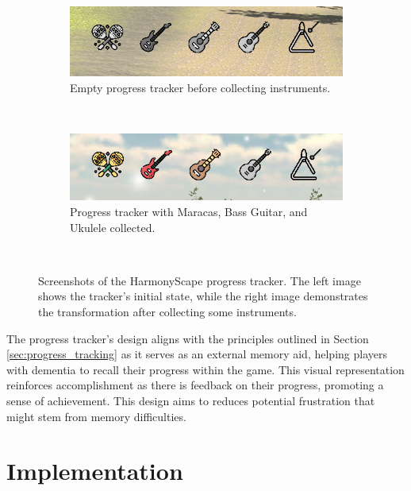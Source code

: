 \documentclass{l4proj}
\begin{document}
\begin{figure}[h]
  \centering
  \begin{subfigure}[b]{0.45\textwidth}
    \includegraphics[width=\textwidth]{dissertation/images/progress_tracker_empty.png}
    \caption{Empty progress tracker before collecting instruments.}
    \label{fig:progress_empty}
  \end{subfigure}
  ~ 
  \begin{subfigure}[b]{0.45\textwidth}
    \includegraphics[width=\textwidth]{dissertation/images/progress_tracker_partial.png} 
    \caption{Progress tracker with Maracas, Bass Guitar, and Ukulele collected.}
    \label{fig:progress_partial}
  \end{subfigure}
  ~  
  \caption{Screenshots of the HarmonyScape progress tracker. The left image shows the tracker's initial state, while the right image demonstrates the transformation after collecting some instruments.}
  \label{fig:progress_tracker}
\end{figure}

The progress tracker's design aligns with the principles outlined in Section \ref{sec:progress_tracking} as it serves as an external memory aid, helping players with dementia to recall their progress within the game. This visual representation reinforces accomplishment as there is feedback on their progress, promoting a sense of achievement. This design aims to reduces potential frustration that might stem from memory difficulties. 

\chapter{Implementation}
\end{document}
